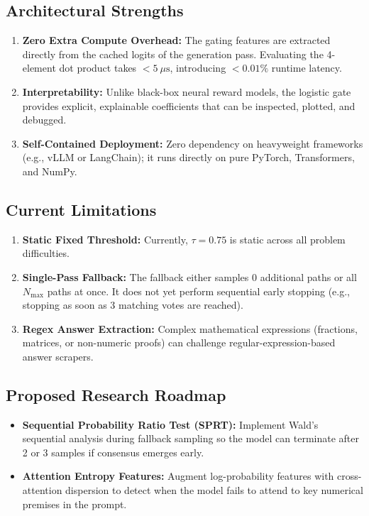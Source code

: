 \documentclass[11pt,a4paper]{article}
\begin{document}
\subsection{Architectural Strengths}
\begin{enumerate}[leftmargin=*]
    \item \textbf{Zero Extra Compute Overhead:} The gating features are extracted directly from the cached logits of the generation pass. Evaluating the 4-element dot product takes $< 5 \ \mu\text{s}$, introducing $<0.01\%$ runtime latency.
    \item \textbf{Interpretability:} Unlike black-box neural reward models, the logistic gate provides explicit, explainable coefficients that can be inspected, plotted, and debugged.
    \item \textbf{Self-Contained Deployment:} Zero dependency on heavyweight frameworks (e.g., vLLM or LangChain); it runs directly on pure PyTorch, Transformers, and NumPy.
\end{enumerate}

\subsection{Current Limitations}
\begin{enumerate}[leftmargin=*]
    \item \textbf{Static Fixed Threshold:} Currently, $\tau = 0.75$ is static across all problem difficulties.
    \item \textbf{Single-Pass Fallback:} The fallback either samples 0 additional paths or all $N_{\text{max}}$ paths at once. It does not yet perform sequential early stopping (e.g., stopping as soon as 3 matching votes are reached).
    \item \textbf{Regex Answer Extraction:} Complex mathematical expressions (fractions, matrices, or non-numeric proofs) can challenge regular-expression-based answer scrapers.
\end{enumerate}

\subsection{Proposed Research Roadmap}
\begin{itemize}[leftmargin=*]
    \item \textbf{Sequential Probability Ratio Test (SPRT):} Implement Wald's sequential analysis during fallback sampling so the model can terminate after 2 or 3 samples if consensus emerges early.
    \item \textbf{Attention Entropy Features:} Augment log-probability features with cross-attention dispersion to detect when the model fails to attend to key numerical premises in the prompt.
\end{itemize}
\end{document}
